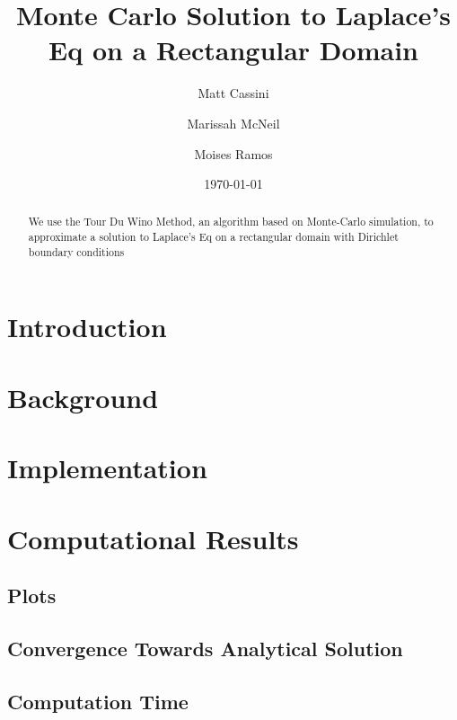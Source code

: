 \documentclass{amsart}
\begin{document}
	
\title{Monte Carlo Solution to Laplace's Eq on a Rectangular Domain}

\author{Matt Cassini}
\address{Department of Mathematical Sciences, New Jersey Institute of Technology, University Heights, Newark, NJ 07102}

\author{Marissah McNeil}
\address{Department of Mathematical Sciences, New Jersey Institute of Technology, University Heights, Newark, NJ 07102}

\author{Moises Ramos}
\address{Department of Mathematical Sciences, New Jersey Institute of Technology, University Heights, Newark, NJ 07102}


\begin{abstract}
	We use the Tour Du Wino Method, an algorithm based on Monte-Carlo simulation, to approximate a solution to Laplace's Eq on a rectangular domain with Dirichlet boundary conditions
\end{abstract}

\date{\today}
\maketitle



\section{Introduction}

\section{Background}

\section{Implementation}

\section{Computational Results}

\subsection{Plots}


\subsection{Convergence Towards Analytical Solution}

\subsection{Computation Time}
\end{document}
